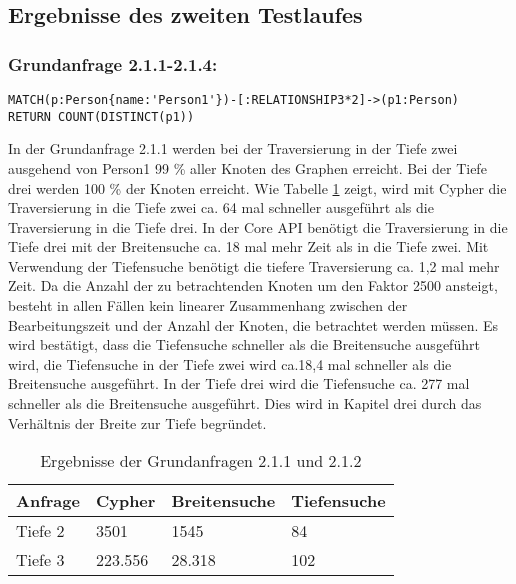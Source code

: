 \subsection{Ergebnisse des zweiten Testlaufes}
\subsubsection{Grundanfrage 2.1.1-2.1.4:}
\begin{Verbatim}[frame=single]
MATCH(p:Person{name:'Person1'})-[:RELATIONSHIP3*2]->(p1:Person) 
RETURN COUNT(DISTINCT(p1))
\end{Verbatim}
In der Grundanfrage 2.1.1 werden bei der Traversierung in der Tiefe zwei ausgehend von Person1 99 \% aller Knoten des Graphen erreicht. Bei der Tiefe drei werden 100 \% der Knoten erreicht. Wie Tabelle \ref{tab:Query2_1} zeigt, wird mit Cypher die Traversierung in die Tiefe zwei ca. 64 mal schneller ausgeführt als die Traversierung in die Tiefe drei. In der Core API benötigt die Traversierung in die Tiefe drei mit der Breitensuche ca. 18 mal mehr Zeit als in die Tiefe zwei. Mit Verwendung der Tiefensuche benötigt die tiefere Traversierung ca. 1,2 mal mehr Zeit. Da die Anzahl der zu betrachtenden Knoten um den Faktor 2500 ansteigt, besteht in allen Fällen kein linearer Zusammenhang zwischen der Bearbeitungszeit und der Anzahl der Knoten, die betrachtet werden müssen. \newline 
Es wird bestätigt, dass die Tiefensuche schneller als die Breitensuche ausgeführt wird, die Tiefensuche in der Tiefe zwei wird ca.18,4 mal schneller als die Breitensuche ausgeführt. In der Tiefe drei wird die Tiefensuche ca. 277 mal schneller als die Breitensuche ausgeführt. Dies wird in Kapitel drei durch das Verhältnis der Breite zur Tiefe begründet. 
\FloatBarrier
\begin{table}[h]
\centering
		\begin{tabular}{ |p{3cm}||p{3cm}|p{3cm}|p{3cm}|  }
			\hline
			Anfrage& Cypher & Breitensuche&Tiefensuche\\
			\hline
			Tiefe 2   & 3501    & 1545&   84\\
			Tiefe 3&    223.556  & 28.318   & 102\\
			\hline
		\end{tabular}
		\caption{Ergebnisse der Grundanfragen 2.1.1 und 2.1.2}
		\label{tab:Query2_1}
\end{table}
\FloatBarrier
